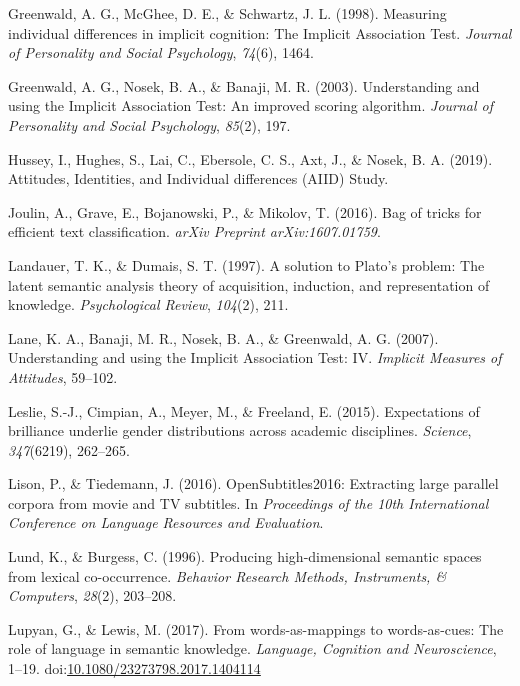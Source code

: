 \documentclass[man,floatsintext]{apa6}
\begin{document}
\leavevmode\hypertarget{ref-greenwald1998measuring}{}%
Greenwald, A. G., McGhee, D. E., \& Schwartz, J. L. (1998). Measuring individual differences in implicit cognition: The Implicit Association Test. \emph{Journal of Personality and Social Psychology}, \emph{74}(6), 1464.

\leavevmode\hypertarget{ref-greenwald2003understanding}{}%
Greenwald, A. G., Nosek, B. A., \& Banaji, M. R. (2003). Understanding and using the Implicit Association Test: An improved scoring algorithm. \emph{Journal of Personality and Social Psychology}, \emph{85}(2), 197.

\leavevmode\hypertarget{ref-aiid}{}%
Hussey, I., Hughes, S., Lai, C., Ebersole, C. S., Axt, J., \& Nosek, B. A. (2019). Attitudes, Identities, and Individual differences (AIID) Study.

\leavevmode\hypertarget{ref-joulin2016bag}{}%
Joulin, A., Grave, E., Bojanowski, P., \& Mikolov, T. (2016). Bag of tricks for efficient text classification. \emph{arXiv Preprint arXiv:1607.01759}.

\leavevmode\hypertarget{ref-landauer1997solution}{}%
Landauer, T. K., \& Dumais, S. T. (1997). A solution to Plato's problem: The latent semantic analysis theory of acquisition, induction, and representation of knowledge. \emph{Psychological Review}, \emph{104}(2), 211.

\leavevmode\hypertarget{ref-lane2007understanding}{}%
Lane, K. A., Banaji, M. R., Nosek, B. A., \& Greenwald, A. G. (2007). Understanding and using the Implicit Association Test: IV. \emph{Implicit Measures of Attitudes}, 59--102.

\leavevmode\hypertarget{ref-leslie2015expectations}{}%
Leslie, S.-J., Cimpian, A., Meyer, M., \& Freeland, E. (2015). Expectations of brilliance underlie gender distributions across academic disciplines. \emph{Science}, \emph{347}(6219), 262--265.

\leavevmode\hypertarget{ref-lison}{}%
Lison, P., \& Tiedemann, J. (2016). OpenSubtitles2016: Extracting large parallel corpora from movie and TV subtitles. In \emph{Proceedings of the 10th International Conference on Language Resources and Evaluation}.

\leavevmode\hypertarget{ref-lund1996producing}{}%
Lund, K., \& Burgess, C. (1996). Producing high-dimensional semantic spaces from lexical co-occurrence. \emph{Behavior Research Methods, Instruments, \& Computers}, \emph{28}(2), 203--208.

\leavevmode\hypertarget{ref-lupyan2017wordsascues}{}%
Lupyan, G., \& Lewis, M. (2017). From words-as-mappings to words-as-cues: The role of language in semantic knowledge. \emph{Language, Cognition and Neuroscience}, 1--19. doi:\href{https://doi.org/10.1080/23273798.2017.1404114}{10.1080/23273798.2017.1404114}
\end{document}
